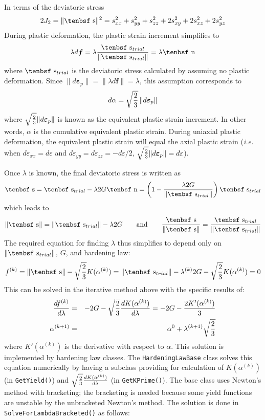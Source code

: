 \documentclass[11pt]{book}
\renewcommand{\vec}[1]{\boldsymbol{#1}}
\def\dev{\hbox{\tenbsf s}}
\def\ndev{\hbox{\tenbsf n}}
\def\code#1{{\small\tt #1}}
\def\dpl{d \vec{\varepsilon}_{p}}
\def\df{d \vec{f}}
\begin{document}
In terms of the deviatoric stress
\begin{equation}
     2J_2 = \|\dev\|^2 =  s_{xx}^2 + s_{yy}^2  + s_{zz}^2 + 2s_{xy}^2 + 2s_{xz}^2 + 2s_{yz}^2 \\
 \end{equation}
During plastic deformation, 
the plastic strain increment simplifies to
\begin{equation}
     \lambda \df = \lambda {\dev_{trial}\over \|\dev_{trial}\|} = \lambda \ndev
\end{equation}
where $ \dev_{trial}$ is the deviatoric stress calculated by assuming no plastic deformation.
Since $\|\dpl\| = \|\lambda \df\| = \lambda$, this assumption corresponds to
\begin{equation}
     d\alpha = \sqrt{2\over3}\thinspace \|\dpl\|
\end{equation}
where $\sqrt{2\over3}\|\dpl\|$ is known as the equivalent plastic strain increment. In other words, $\alpha$ is the cumulative equivalent plastic strain. During uniaxial plastic deformation, the equivalent plastic strain will equal the axial plastic strain ({\em i.e.} when $d\varepsilon_{xx}=d\varepsilon$ and $d\varepsilon_{yy}=d\varepsilon_{zz} = -d\varepsilon/2$, $\sqrt{2\over3}\|\dpl\| = d\varepsilon$).

Once $\lambda$ is known, the final deviatoric stress is written as
\begin{equation}
        \dev = \dev_{trial} - \lambda 2G\ndev = \left(1- {\lambda 2G\over \|\dev_{trial}\|}\right) \dev_{trial}
\end{equation}
which leads to
\begin{equation}
         \|\dev\| =  \|\dev_{trial}\| - \lambda 2G \qquad {\rm and} \qquad 
         {\dev\over \|\dev\|} = {\dev_{trial}\over \|\dev_{trial}\|}
\end{equation}
The required equation for finding $\lambda$ thus simplifies to depend only on $\|\dev_{trial}\|$, $G$, and hardening law:
\begin{equation}
      f^{(k)} = \|\dev\| -  \sqrt{2\over3} K(\alpha^{(k)}) = \|\dev_{trial}\| - \lambda^{(k)} 2G -  \sqrt{2\over3} K(\alpha^{(k)}) = 0
\end{equation}
This can be solved in the iterative method above with the specific results of:
\begin{eqnarray}
        {df^{(k)}\over d\lambda} & = & -2G - \sqrt{2\over3}{dK(\alpha^{(k)})\over d\lambda}  = -2G - {2K'(\alpha^{(k)})\over 3} \\
        \alpha^{(k+1)} & = & \alpha^{0} +  \lambda^{(k+1)} \sqrt{2\over3}
\end{eqnarray}
where $K'(\alpha^{(k)})$ is the derivative with respect to $\alpha$. This solution is implemented by hardening law classes. The {\tt HardeningLawBase} class solves this equation numerically by having a subclass providing for calculation of $K(\alpha^{(k)})$ (in \code{GetYield()}) and $\sqrt{2\over3}{dK(\alpha^{(k)})\over d\lambda}$ (in \code{GetKPrime()}). The base class uses Newton's method with bracketing; the bracketing is needed because some yield functions are unstable by the unbracketed Newton's method. The solution is done in {\tt SolveForLambdaBracketed()} as follows:
\end{document}
